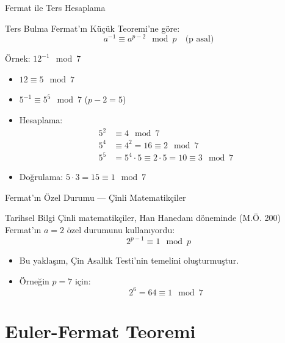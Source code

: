 \documentclass{beamer}
\begin{document}
\begin{frame}{Fermat ile Ters Hesaplama}
  \begin{block}{Ters Bulma}
    Fermat'ın Küçük Teoremi'ne göre:
    \[
      a^{-1} \equiv a^{p-2} \mod p \quad \text{(p asal)}
    \]
  \end{block}
  
  \begin{exampleblock}{Örnek: $12^{-1} \mod 7$}
    \begin{itemize}
      \item $12 \equiv 5 \mod 7$
      \item $5^{-1} \equiv 5^{5} \mod 7$ ($p-2=5$)
      \item Hesaplama:
      \begin{align*}
        5^2 &\equiv 4 \mod 7 \\
        5^4 &\equiv 4^2 = 16 \equiv 2 \mod 7 \\
        5^5 &= 5^4 \cdot 5 \equiv 2 \cdot 5 = 10 \equiv 3 \mod 7
      \end{align*}
      \item Doğrulama: $5 \cdot 3 = 15 \equiv 1 \mod 7$
    \end{itemize}
  \end{exampleblock}
\end{frame}

\begin{frame}{Fermat'ın Özel Durumu — Çinli Matematikçiler}
  \begin{block}{Tarihsel Bilgi}
    Çinli matematikçiler, Han Hanedanı döneminde (M.Ö. 200) Fermat'ın $a = 2$ özel durumunu kullanıyordu:
    \[
      2^{p - 1} \equiv 1 \mod p
    \]
  \end{block}

  \begin{itemize}
    \item Bu yaklaşım, Çin Asallık Testi'nin temelini oluşturmuştur.
    \item Örneğin $p=7$ için:
    \[
      2^6 = 64 \equiv 1 \mod 7
    \]
  \end{itemize}
\end{frame}

\section{Euler-Fermat Teoremi}
\end{document}
